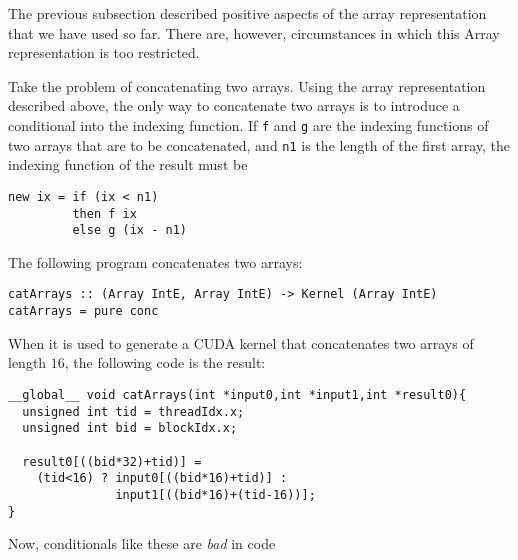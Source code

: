 

The previous subsection described positive aspects of the array 
representation that we have used so far. There are, however, 
circumstances in which this Array representation is too restricted. 

Take the problem of concatenating two arrays. Using the array representation 
described above, the only way to concatenate two arrays is to introduce 
a conditional into the indexing function. If {\tt f} and {\tt g} are the 
indexing functions of two arrays that are to be concatenated, and {\tt n1}
is the length of the first array, the indexing 
function of the result must be
\begin{codesize}
\begin{verbatim}
new ix = if (ix < n1) 
         then f ix 
         else g (ix - n1)
\end{verbatim}
\end{codesize}
The following program
concatenates two arrays: 
\begin{codesize}
\begin{verbatim}
catArrays :: (Array IntE, Array IntE) -> Kernel (Array IntE)
catArrays = pure conc
\end{verbatim}
\end{codesize}
When it is used to generate a CUDA kernel that concatenates
two arrays of length $16$, the following code is the result: 
\begin{codesize}
\begin{verbatim}
__global__ void catArrays(int *input0,int *input1,int *result0){
  unsigned int tid = threadIdx.x;
  unsigned int bid = blockIdx.x;
  
  result0[((bid*32)+tid)] = 
    (tid<16) ? input0[((bid*16)+tid)] : 
               input1[((bid*16)+(tid-16))];
}
\end{verbatim}
\end{codesize}
%  
%  
Now, conditionals like these are {\em bad} in code 
